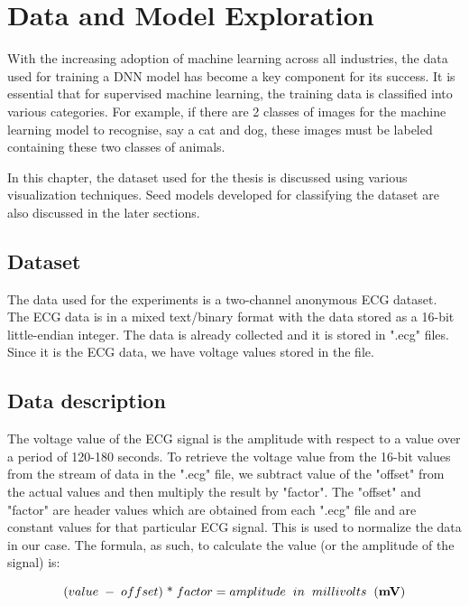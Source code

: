 \chapter{Data and Model Exploration} %
\label{chap:data_exploration}

With the increasing adoption of machine learning across all industries, the data used for training a DNN model has become a key component for its success. It is essential that for supervised machine learning, the training data is classified into various categories. For example, if there are 2 classes of images for the machine learning model to recognise, say a cat and dog, these images must be labeled containing these two classes of animals.

In this chapter, the dataset used for the thesis is discussed using various visualization techniques. Seed models developed for classifying the dataset are also discussed in the later sections.

\section{Dataset}

The data used for the experiments is a two-channel anonymous ECG dataset. The ECG data is in a mixed text/binary format with the data stored as a 16-bit little-endian integer. The data is already collected and it is stored in ".ecg" files. Since it is the ECG data, we have voltage values stored in the file. 

\section{Data description}
\label{sec:data_description}
The voltage value of the ECG signal is the amplitude with respect to a value over a period of 120-180 seconds. To retrieve the voltage value from the 16-bit values from the stream of data in the ".ecg" file, we subtract value of the "offset" from the actual values and then multiply the result by "factor". The "offset" and "factor" are header values which are obtained from each ".ecg" file and are constant values for that particular ECG signal. This is used to normalize the data in our case. The formula, as such, to calculate the value (or the amplitude of the signal) is:

\[ (value\hspace{1mm} -\hspace{1mm} offset)\hspace{1mm} \mbox{*}\hspace{1mm} factor = amplitude\hspace{2mm} in\hspace{2mm} millivolts\hspace{2mm}(\textbf{mV}) \]

